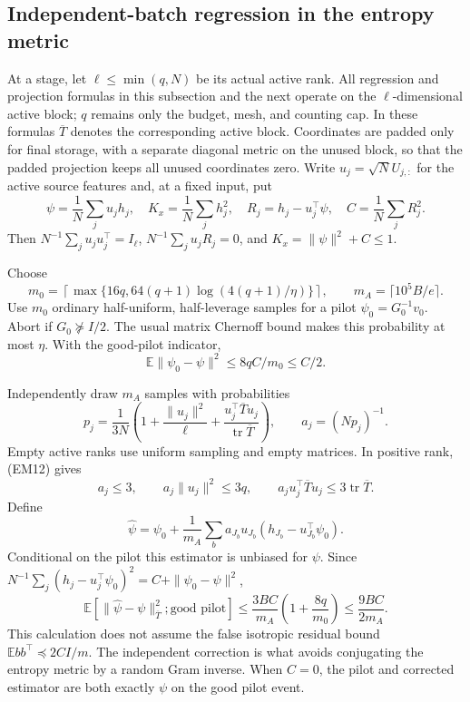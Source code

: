 \subsection{Independent-batch regression in the entropy metric}

At a stage, let $\ell\le\min(q,N)$ be its actual active rank. All
regression and projection formulas in this subsection and the next
operate on the $\ell$-dimensional active block; $q$ remains only the
budget, mesh, and counting cap. In these formulas $\overline T$ denotes
the corresponding active block. Coordinates are padded only for final
storage, with a separate diagonal metric on the unused block, so that
the padded projection keeps all unused coordinates zero.
Write $u_j=\sqrt N U_{j,:}$ for the active source features and, at a
fixed input, put
\[
 \psi=\frac1N\sum_j u_jh_j,\quad
 K_x=\frac1N\sum_jh_j^2,\quad
 R_j=h_j-u_j^\top\psi,\quad C=\frac1N\sum_jR_j^2.
\]
Then $N^{-1}\sum_j u_ju_j^\top=I_\ell$,
$N^{-1}\sum_j u_jR_j=0$, and $K_x=\|\psi\|^2+C\le1$.

Choose
\[
 m_0=\left\lceil\max\{16q,
       64(q+1)\log(4(q+1)/\eta)\}\right\rceil,
 \qquad m_A=\lceil10^5B/e\rceil.
 \tag{EM10}
\]
Use $m_0$ ordinary half-uniform, half-leverage samples for a pilot
$\psi_0=G_0^{-1}v_0$. Abort if $G_0\not\succeq I/2$.
The usual matrix Chernoff bound makes this probability at most $\eta$.
With the good-pilot indicator,
\[
 \mathbb E\|\psi_0-\psi\|^2\le8qC/m_0\le C/2.
 \tag{EM11}
\]

Independently draw $m_A$ samples with probabilities
\[
 p_j=\frac1{3N}\left(1+\frac{\|u_j\|^2}{\ell}
       +\frac{u_j^\top\overline T u_j}
                    {\operatorname{tr}\overline T}\right),
 \qquad a_j=(Np_j)^{-1}.
 \tag{EM12}
\]
Empty active ranks use uniform sampling and empty matrices. In positive
rank, (EM12) gives
\[
 a_j\le3,\qquad a_j\|u_j\|^2\le3q,\qquad
 a_j u_j^\top\overline T u_j\le3\operatorname{tr}\overline T.
\]
Define
\[
 \widehat\psi=\psi_0+\frac1{m_A}
       \sum_b a_{J_b}u_{J_b}(h_{J_b}-u_{J_b}^\top\psi_0).
 \tag{EM13}
\]
Conditional on the pilot this estimator is unbiased for $\psi$.
Since
$N^{-1}\sum_j(h_j-u_j^\top\psi_0)^2=C+\|\psi_0-\psi\|^2$,
\[
 \mathbb E[\|\widehat\psi-\psi\|_{\overline T}^2;
                  \text{good pilot}]
 \le\frac{3BC}{m_A}\left(1+\frac{8q}{m_0}\right)
 \le\frac{9BC}{2m_A}.
 \tag{EM14}
\]
This calculation does not assume the false isotropic residual bound
$\mathbb E bb^\top\preceq2CI/m$. The independent correction is
what avoids conjugating the entropy metric by a random Gram inverse.
When $C=0$, the pilot and corrected estimator are both exactly $\psi$
on the good pilot event.

